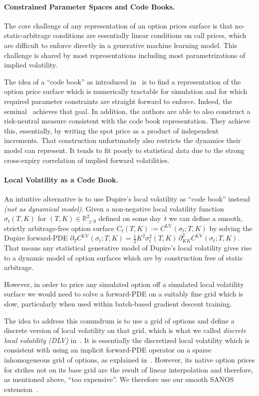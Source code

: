 \documentclass[11pt,a4paper]{article}
\newcommand{\R}{\mathbb{R}}
\begin{document}
\paragraph{Constrained Parameter Spaces and Code Books.}
The core challenge of any representation of an option prices surface is that no-static-arbitrage conditions are essentially
linear conditions on call prices, which are difficult to enforce directly in a generative machine learning model. 
This challenge is shared by most representations including most parametrizations of implied volatility.

The idea of a ``code book'' as introduced in~\cite{TangentLevy} is to find a representation of the option price surface
which is numerically tractable for simulation and for which required parameter constraints are straight forward to enforce.
Indeed, the seminal~\cite{TangentLevy} achieves that goal. In addition, the authors are able to also
construct a risk-neutral measure consistent with the code book representation.
They achieve this, essentially, by writing the spot price as a product of independent increments. That construction unfortunately also restricts
the dynamics their model can represent. It tends to fit poorly to statistical data due to the strong cross-expiry correlation of implied forward volatilities.

\paragraph{Local Volatility as a Code Book.}
An intuitive alternative is to use Dupire's local volatility as ``code book'' instead 
\emph{(not as dynamical model)}. Given a non-negative local volatility function
$\sigma_t(T,K)$ for $(T,K)\in\R^2_{\geq 0}$ defined on some day~$t$
we can define 
a smooth, strictly arbitrage-free option surface 
$C_t(T,K):=C^\mathrm{LV}(\sigma_t;T,K)$ 
by solving the Dupire forward-PDE
$\partial_T C^\mathrm{LV}(\sigma_t;T,K)
 = \mbox{$\frac12$}K^2\sigma_t^2(T,K)\,
   \partial^2_{KK}C^\mathrm{LV}(\sigma_t;T,K)$.
That means any statistical generative model of Dupire's local volatility gives rise
to a dynamic model of option surfaces which are by construction free of static arbitrage.

However, in order to price any simulated option off a simulated local volatility surface
we would need to solve a forward-PDE on a suitably
fine grid which is slow, particularly when used within batch-based gradient descent training.

The idea to address this conundrum is to use a grid of options and define a discrete version
of local volatility on that grid, which is what we called
\emph{discrete local volatility (DLV)} in~\cite{DLV}. 
It is essentially the discretized local volatility which is consistent with using an implicit forward-PDE operator on a sparse inhomogeneous grid of options,
as explained in~\cite{AndreasenHuge}.
However,
its native option prices for strikes not on its base grid are the result of linear interpolation and therefore, as mentioned above, ``too expensive''.
We therefore use
our smooth SANOS extension~\cite{SANOS2026}.
\end{document}
